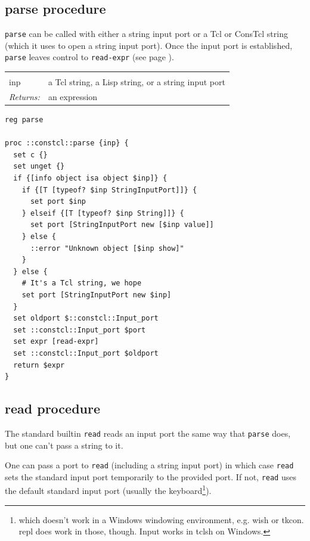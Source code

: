 \documentclass[twoside]{report}
\begin{document}
\subsection{parse procedure}
\label{parse-procedure}

\texttt{parse} can be called with either a string input port or a Tcl or ConsTcl string (which it uses to open a string input port). Once the input port is established, \texttt{parse} leaves control to \texttt{read-expr} (see page \pageref{readexpr-procedure}).

\noindent\begin{tabular}{ |p{1.9cm} p{8cm}| }
\hline
\rowcolor[HTML]{CCCCCC} \multicolumn{2}{|l|}{\bf parse (internal)} \\
inp & a Tcl string, a Lisp string, or a string input port \\
\textit{Returns:} & an expression \\
\hline
\end{tabular}

\begin{lstlisting}
reg parse

proc ::constcl::parse {inp} {
  set c {}
  set unget {}
  if {[info object isa object $inp]} {
    if {[T [typeof? $inp StringInputPort]]} {
      set port $inp
    } elseif {[T [typeof? $inp String]]} {
      set port [StringInputPort new [$inp value]]
    } else {
      ::error "Unknown object [$inp show]"
    }
  } else {
    # It's a Tcl string, we hope
    set port [StringInputPort new $inp]
  }
  set oldport $::constcl::Input_port
  set ::constcl::Input_port $port
  set expr [read-expr]
  set ::constcl::Input_port $oldport
  return $expr
}
\end{lstlisting}

\subsection{read procedure}
\label{read-procedure}

The standard builtin \texttt{read} reads an input port the same way that \texttt{parse} does, but one can't pass a string to it.

One can pass a port to \texttt{read} (including a string input port) in which case \texttt{read} sets the standard input port temporarily to the provided port. If not, \texttt{read} uses the default standard input port (usually the keyboard\footnote{which doesn't work in a Windows windowing environment, e.g. wish or tkcon. repl does work in those, though. Input works in tclsh on Windows.}).
\end{document}
